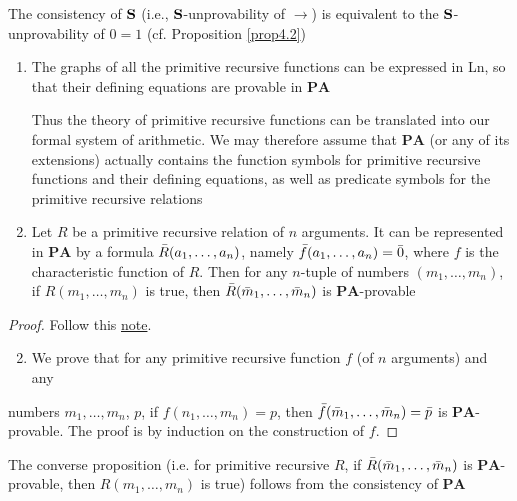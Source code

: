 \documentclass[11pt]{article}
\def \PA {\textbf{PA}}
\begin{document}
\begin{lemma}[]
The consistency of \(\operatorname{\textbf{S}}\) (i.e., \(\operatorname{\textbf{S}}\)-unprovability of \(\to\)) is equivalent to
the \(\operatorname{\textbf{S}}\)-unprovability of \(0=1\) (cf. Proposition \ref{prop4.2})
\end{lemma}

\begin{proposition}[Gödel]
\label{prop10.6}
\begin{enumerate}
\item The graphs of all the primitive recursive functions can be expressed in Ln, so that their
defining equations are provable in \(\PA\)

Thus the theory of primitive recursive functions can be translated into our formal system of
arithmetic. We may therefore assume that \(\PA\) (or any of its extensions) actually contains
the function symbols for primitive recursive functions and their defining equations, as well
as predicate symbols for the primitive recursive relations
\item Let \(R\) be a primitive recursive relation of \(n\) arguments. It can be represented
in \(\PA\) by a formula \(\bar{R}(a_1,\dots,a_n)\), namely \(\bar{f}(a_1,\dots,a_n)=\bar{0}\),
where \(f\) is the characteristic function of \(R\). Then for any \(n\)-tuple of
numbers \((m_1,\dots,m_n)\), if \(R(m_1,\dots,m_n)\) is true,
then \(\bar{R}(\bar{m}_1,\dots,\bar{m}_n)\) is \(\PA\)-provable
\end{enumerate}
\end{proposition}

\begin{proof}
Follow this \href{http://www.cs.cornell.edu/courses/cs4860/2009sp/lec-22.pdf}{note}.


\begin{enumerate}
\setcounter{enumi}{1}
\item We prove that for any primitive recursive function \(f\) (of \(n\) arguments) and any
\end{enumerate}
numbers \(m_1,\dots,m_n\), \(p\), if \(f(n_1,\dots,m_n)=p\),
then \(\bar{f}(\bar{m}_1,\dots,\bar{m}_n)=\bar{p}\) is \(\PA\)-provable. The proof is by induction on
the construction of \(f\).
\end{proof}

The converse proposition (i.e. for primitive recursive \(R\), if \(\bar{R}(\bar{m}_1,\dots,\bar{m}_n)\)
is \(\PA\)-provable, then \(R(m_1,\dots,m_n)\) is true) follows from the consistency of \(\PA\)
\end{document}
